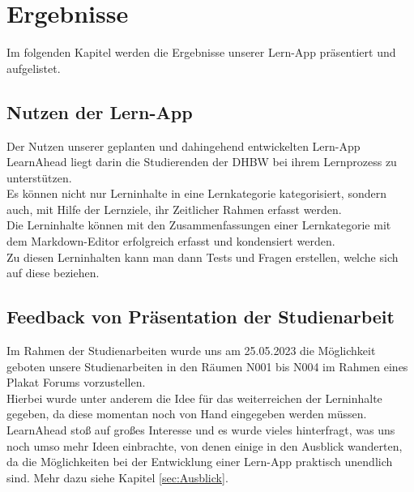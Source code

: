 \section{Ergebnisse}
Im folgenden Kapitel werden die Ergebnisse unserer Lern-App präsentiert und aufgelistet.
\subsection{Nutzen der Lern-App}
Der Nutzen unserer geplanten und dahingehend entwickelten Lern-App LearnAhead liegt darin die Studierenden der DHBW bei ihrem Lernprozess zu unterstützen.\\

\noindent
Es können nicht nur Lerninhalte in eine Lernkategorie kategorisiert, sondern auch, mit Hilfe der Lernziele, ihr Zeitlicher Rahmen erfasst werden.\\

\noindent
Die Lerninhalte können mit den Zusammenfassungen einer Lernkategorie mit dem Markdown-Editor erfolgreich erfasst und kondensiert werden.\\
Zu diesen Lerninhalten kann man dann Tests und Fragen erstellen, welche sich auf diese beziehen.

\subsection{Feedback von Präsentation der Studienarbeit}
Im Rahmen der Studienarbeiten wurde uns am 25.05.2023 die Möglichkeit geboten unsere Studienarbeiten in den Räumen N001 bis N004 im Rahmen eines Plakat Forums vorzustellen. \\

\noindent
Hierbei wurde unter anderem die Idee für das weiterreichen der Lerninhalte gegeben, da diese momentan noch von Hand eingegeben werden müssen.\\

\noindent
LearnAhead stoß auf großes Interesse und es wurde vieles hinterfragt, was uns noch umso mehr Ideen einbrachte, von denen einige in den Ausblick wanderten, da die Möglichkeiten bei der Entwicklung einer Lern-App praktisch unendlich sind. Mehr dazu siehe Kapitel \ref{sec:Ausblick}.

\newpage
